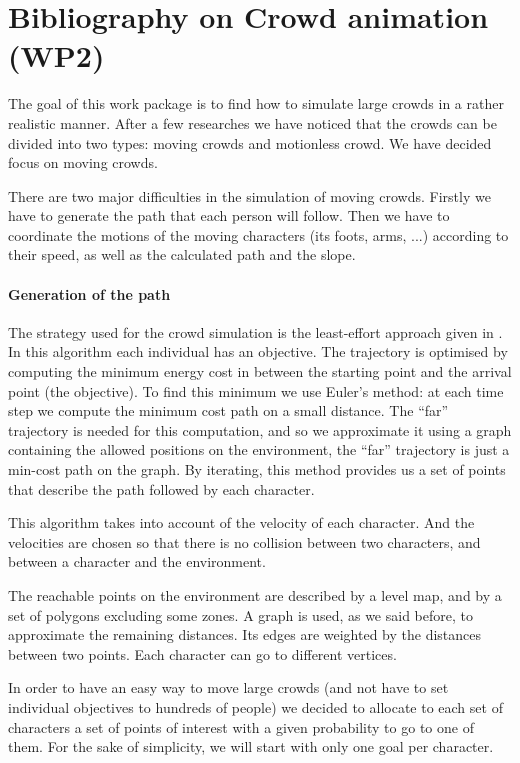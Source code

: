 \section{Bibliography on Crowd animation (WP2)}

The goal of this work package is to find how to simulate large crowds in a rather realistic manner. After a few researches we have noticed that the crowds can be divided into two types: moving crowds and motionless crowd. We have decided focus on moving crowds. 

There are two major difficulties in the simulation of moving crowds. Firstly we have to generate the path that each person will follow. Then we have to coordinate the motions of the moving characters (its foots, arms, ...) according to their speed, as well as the calculated path and the slope.


\paragraph{Generation of the path}

The strategy used for the crowd simulation is the least-effort approach given in \cite{PLE}.\\

In this algorithm each individual has an objective. The trajectory is optimised by computing the minimum energy cost in between the starting point and the arrival point (the objective). To find this minimum we use Euler's method: at each time step we compute the minimum cost path on a small distance. The ``far'' trajectory is needed for this computation, and so we approximate it using a graph containing the allowed positions on the environment, the ``far'' trajectory is just a min-cost path on the graph. By iterating, this method provides us a set of points that describe the path followed by each character.

This algorithm takes into account of the velocity of each character. And the velocities are chosen so that there is no collision between two characters, and between a character and the environment.

The reachable points on the environment are described by a level map, and by a set of polygons excluding some zones. A graph is used, as we said before, to approximate the remaining distances. Its edges are weighted by the distances between two points. Each character can go to different vertices.

In order to have an easy way to move large crowds (and not have to set individual objectives to hundreds of people) we decided to allocate to each set of characters a set of points of interest with a given probability to go to one of them. For the sake of simplicity, we will start with only one goal per character.

